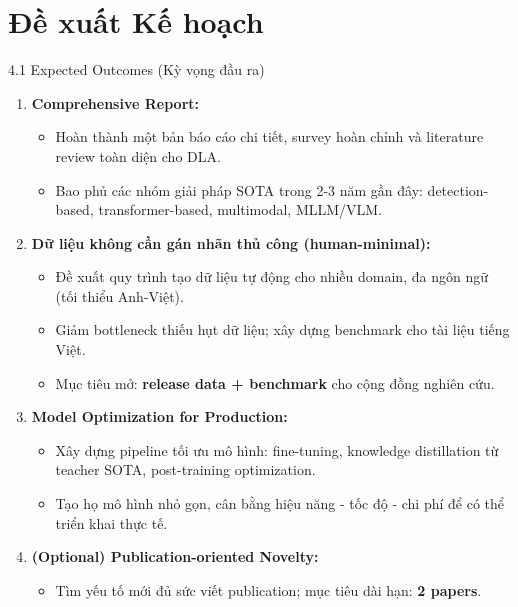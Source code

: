 \documentclass[aspectratio=1610,8pt]{beamer}
\begin{document}
\section{Đề xuất Kế hoạch}
\begin{frame}{4.1 \; Expected Outcomes (Kỳ vọng đầu ra)}
    \begin{enumerate}
        \item \textbf{Comprehensive Report:}
        \begin{itemize}
            \item Hoàn thành một bản báo cáo chi tiết, survey hoàn chỉnh và literature review toàn diện cho DLA.
            \item Bao phủ các nhóm giải pháp SOTA trong 2-3 năm gần đây: detection-based, transformer-based, multimodal, MLLM/VLM.
        \end{itemize}

        \item \textbf{Dữ liệu không cần gán nhãn thủ công (human-minimal):}
        \begin{itemize}
            \item Đề xuất quy trình tạo dữ liệu tự động cho nhiều domain, đa ngôn ngữ (tối thiểu Anh-Việt).
            \item Giảm bottleneck thiếu hụt dữ liệu; xây dựng benchmark cho tài liệu tiếng Việt.
            \item Mục tiêu mở: \textbf{release data + benchmark} cho cộng đồng nghiên cứu.
        \end{itemize}

        \item \textbf{Model Optimization for Production:}
        \begin{itemize}
            \item Xây dựng pipeline tối ưu mô hình: fine-tuning, knowledge distillation từ teacher SOTA, post-training optimization.
            \item Tạo họ mô hình nhỏ gọn, cân bằng hiệu năng - tốc độ - chi phí để có thể triển khai thực tế.
        \end{itemize}

        \item \textbf{(Optional) Publication-oriented Novelty:}
        \begin{itemize}
            \item Tìm yếu tố mới đủ sức viết publication; mục tiêu dài hạn: \textbf{2 papers}.
        \end{itemize}
    \end{enumerate}
\end{frame}
\end{document}
